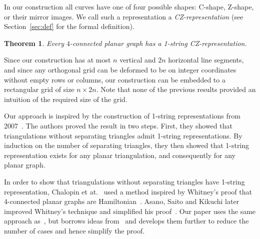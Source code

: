 \documentclass{article}
\newtheorem{theorem}{Theorem}[section]
\begin{document}
In our construction all curves have one of four
possible shapes: C-shape, Z-shape, or their mirror images. We call such a 
representation a \emph{CZ-representation} (see Section~\ref{sec:def} for
the formal definition).

\begin{theorem}
\label{thm:main-claim}
Every $4$-connected planar graph has a 1-string CZ-rep\-re\-sen\-ta\-tion. 
\end{theorem}



Since our construction has at most $n$ vertical and $2n$ horizontal line segments, and
since any orthogonal grid can be deformed to be on integer coordinates 
without empty rows
or columns, our construction can be embedded to a rectangular grid of size $n \times 2n$.
Note that none of the previous results provided an intuition of the required size of the grid.

Our approach is inspired by the construction of 1-string representations from 
2007~\cite{cit:chalopin-gonclaves-ochem, cit:chalopin-string}. 
The authors proved the result in two steps. First,
they showed that triangulations without separating triangles 
admit 1-string representations. By induction on the number of 
separating triangles, they then showed that 1-string representation
exists for any planar triangulation, and consequently for any 
planar graph. 

In order to show that triangulations without separating triangles
have 1-string representation, Chalopin et at.~\cite{cit:chalopin-string} used
a method inspired by Whitney's proof that 4-connected planar graphs
are Hamiltonian~\cite{cit:whitney}. Asano, Saito and Kikuchi later improved
Whitney's technique and simplified his proof~\cite{cit:ham-cycle}. 
Our paper uses the same approach as~\cite{cit:chalopin-string}, but borrows ideas from~\cite{cit:ham-cycle}
and develops them further to reduce the number of cases and hence
simplify the proof. 


\iffalse
A~CZ-representation uses two bends for every curve, thus our result
implies that triangulations with no separating triangles as 2-VPG. 
Our construction uses precisely one intersection per edge. Thus, it is 
stronger than the result of~\cite{cit:chaplick} for this specific subclass
of planar graphs.

Furthermore, the result presented here immediately implies that planar triangulations
with no separating triangles have 1-string representations, which is an intermediate
step of~\cite{cit:chalopin-string} for showing that this is true for all planar graphs.
Compared to~\cite{cit:chalopin-string}, our approach significantly reduces the number of analysed cases.
\fi
\end{document}
